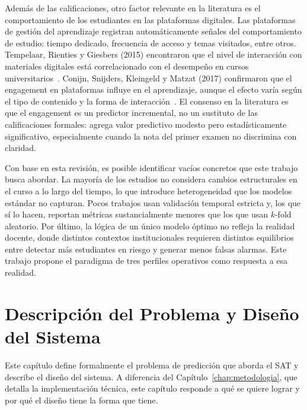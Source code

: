 \documentclass[12pt, letterpaper, openany]{report}
\begin{document}
Además de las calificaciones, otro factor relevante en la literatura es el comportamiento de los estudiantes en las plataformas digitales. Las plataformas de gestión del aprendizaje registran automáticamente señales del comportamiento de estudio: tiempo dedicado, frecuencia de acceso y temas visitados, entre otros. Tempelaar, Rienties y Giesbers (2015) encontraron que el nivel de interacción con materiales digitales está correlacionado con el desempeño en cursos universitarios~\cite{Tempelaar2015}.
Conijn, Snijders, Kleingeld y Matzat (2017) confirmaron que el engagement en plataformas influye en el aprendizaje, aunque el efecto varía según el tipo de contenido y la forma de interacción~\cite{Conijn2017}. El consenso en la literatura es que el engagement es un predictor incremental, no un sustituto de las calificaciones formales: agrega valor predictivo modesto pero estadísticamente significativo, especialmente cuando la nota del primer examen no discrimina con claridad.

Con base en esta revisión, es posible identificar vacíos concretos que este trabajo busca abordar. La mayoría de los estudios no considera cambios estructurales en el curso a lo largo del tiempo, lo que 
introduce heterogeneidad que los modelos estándar no capturan. Pocos trabajos usan validación temporal estricta y, los que sí lo hacen, reportan métricas sustancialmente menores que los que usan $k$-fold 
aleatorio. Por último, la lógica de un único modelo óptimo no refleja la realidad docente, donde distintos contextos institucionales requieren distintos equilibrios entre detectar más estudiantes en riesgo y generar menos falsas alarmas. Este trabajo propone el paradigma de tres perfiles 
operativos como respuesta a esa realidad.

\chapter{Descripción del Problema y Diseño del Sistema}
\label{chap:problema}

Este capítulo define formalmente el problema de predicción que aborda el SAT y describe el diseño del sistema. A diferencia del Capítulo~\ref{chap:metodologia}, que detalla la implementación técnica, este capítulo responde a qué se quiere lograr y por qué el diseño tiene la forma que tiene.
\end{document}
